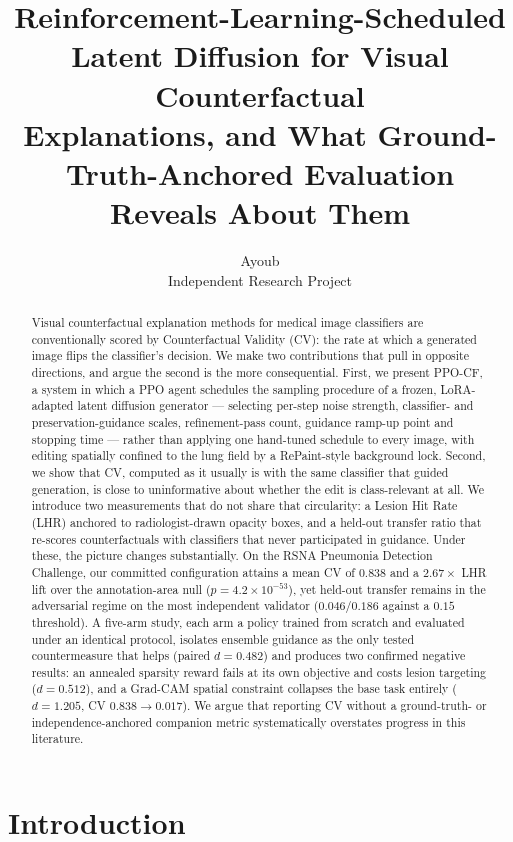 \documentclass[10pt,twocolumn,letterpaper]{article}
\title{Reinforcement-Learning-Scheduled Latent Diffusion for Visual Counterfactual\\
Explanations, and What Ground-Truth-Anchored Evaluation Reveals About Them}
\author{Ayoub\\
Independent Research Project\\
}
\newcommand{\method}{\textsc{PPO-CF}}
\begin{document}
\maketitle

\begin{abstract}
Visual counterfactual explanation methods for medical image classifiers
are conventionally scored by Counterfactual Validity (CV): the rate at
which a generated image flips the classifier's decision. We make two
contributions that pull in opposite directions, and argue the second is
the more consequential. First, we present \method{}, a system in which a
PPO agent schedules the sampling procedure of a frozen, LoRA-adapted
latent diffusion generator --- selecting per-step noise strength,
classifier- and preservation-guidance scales, refinement-pass count,
guidance ramp-up point and stopping time --- rather than applying one
hand-tuned schedule to every image, with editing spatially confined to
the lung field by a RePaint-style background lock. Second, we show that
CV, computed as it usually is with the same classifier that guided
generation, is close to uninformative about whether the edit is
class-relevant at all. We introduce two measurements that do not share
that circularity: a Lesion Hit Rate (LHR) anchored to radiologist-drawn
opacity boxes, and a held-out transfer ratio that re-scores
counterfactuals with classifiers that never participated in guidance.
Under these, the picture changes substantially. On the RSNA Pneumonia
Detection Challenge, our committed configuration attains a mean CV of
$0.838$ and a $2.67\times$ LHR lift over the annotation-area null
($p=4.2\times10^{-53}$), yet held-out transfer remains in the adversarial
regime on the most independent validator ($0.046$/$0.186$ against a
$0.15$ threshold). A five-arm study, each arm a policy trained from
scratch and evaluated under an identical protocol, isolates ensemble
guidance as the only tested countermeasure that helps (paired
$d=0.482$) and produces two confirmed negative results: an annealed
sparsity reward fails at its own objective and costs lesion targeting
($d=0.512$), and a Grad-CAM spatial constraint collapses the base task
entirely ($d=1.205$, CV $0.838\to0.017$). We argue that reporting CV
without a ground-truth- or independence-anchored companion metric
systematically overstates progress in this literature.
\end{abstract}

\section{Introduction}
\end{document}
